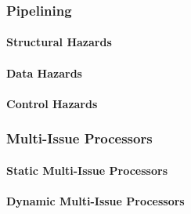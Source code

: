 \begin{multicols*}{3}
    \subsubsection{Pipelining}

    \paragraph{Structural Hazards}

    \paragraph{Data Hazards}

    \paragraph{Control Hazards}

    \subsubsection{Multi-Issue Processors}

    \paragraph{Static Multi-Issue Processors}

    \paragraph{Dynamic Multi-Issue Processors}

\end{multicols*}